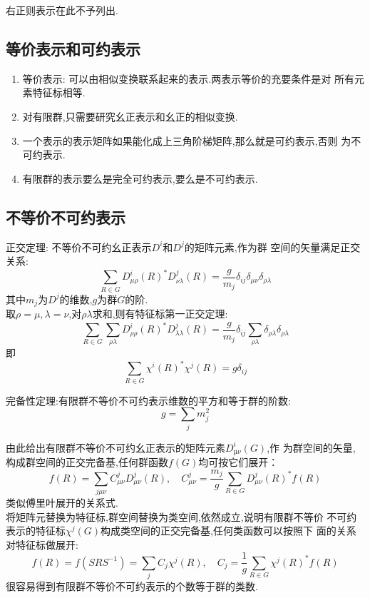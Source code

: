 \documentclass{ctexart}
\begin{document}
右正则表示在此不予列出.

\subsection{等价表示和可约表示}

\begin{enumerate}
    \item 等价表示: 可以由相似变换联系起来的表示.两表示等价的充要条件是对
    所有元素特征标相等.
    \item 对有限群,只需要研究幺正表示和幺正的相似变换.
    \item 一个表示的表示矩阵如果能化成上三角阶梯矩阵,那么就是可约表示,否则
    为不可约表示.
    \item 有限群的表示要么是完全可约表示,要么是不可约表示.
\end{enumerate}

\subsection{不等价不可约表示}

\noindent 正交定理: 不等价不可约幺正表示$D^{i}$和$D^{j}$的矩阵元素,作为群
空间的矢量满足正交关系:
\[
\sum_{R\in G}D^{i}_{\mu\rho}(R)^{*}D^{j}_{\nu\lambda}(R)=\frac{g}{m_{j}}\delta_{ij}\delta_{\mu\nu}\delta_{\rho\lambda}
\]
其中$m_{j}$为$D^{j}$的维数,$g$为群$G$的阶.\\
取$\rho=\mu,\lambda=\nu$,对$\rho\lambda$求和,则有特征标第一正交定理:
\[
\sum_{R\in G}\sum_{\rho\lambda}D^{i}_{\rho\rho}(R)^{*}D^{j}_{\lambda\lambda}(R)=\frac{g}{m_{j}}\delta_{ij}\sum_{\rho\lambda}\delta_{\rho\lambda}\delta_{\rho\lambda}
\]
即
\[
\sum_{R\in G}\chi^{i}(R)^{*}\chi^{j}(R)=g\delta_{ij}
\]

\noindent 完备性定理:有限群不等价不可约表示维数的平方和等于群的阶数:
\[
g=\sum_{j}m_{j}^{2}
\]

\noindent 由此给出有限群不等价不可约幺正表示的矩阵元素$D^{i}_{µν}(G)$,作
为群空间的矢量,构成群空间的正交完备基,任何群函数$f(G)$均可按它们展开：
\[
f(R)=\sum_{j\mu\nu}C^{j}_{\mu\nu}D^{j}_{\mu\nu}(R),\quad C^{j}_{\mu\nu}=\frac{m_{j}}{g}\sum_{R\in G}D^{j}_{\mu\nu}(R)^{*}f(R)
\]
类似傅里叶展开的关系式.\\

\noindent 将矩阵元替换为特征标,群空间替换为类空间,依然成立,说明有限群不等价
不可约表示的特征标$\chi^{j}(G)$构成类空间的正交完备基,任何类函数可以按照下
面的关系对特征标做展开:
\[
f(R)=f(SRS^{-1})=\sum_{j}C_{j}\chi^{j}(R),\quad C_{j}=\frac{1}{g}\sum_{R\in G}\chi^{j}(R)^{*}f(R)
\]
很容易得到有限群不等价不可约表示的个数等于群的类数.
\end{document}
